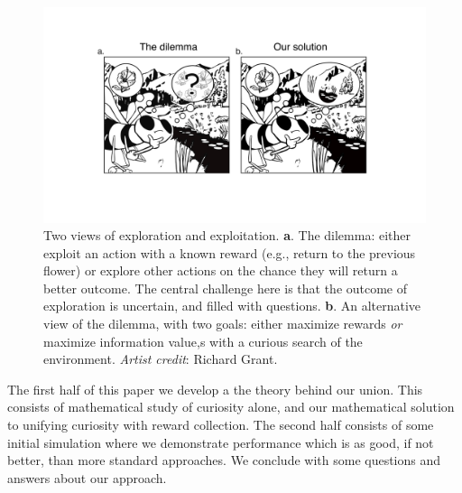 \begin{figure}
	\begin{fullwidth}
	\includegraphics[width=.9\linewidth]{img/bee.pdf} 
	\caption{Two views of exploration and exploitation. \textbf{a}. The dilemma: either exploit an action with a known reward (e.g., return to the previous flower) or explore other actions on the chance they will return a better outcome. The central challenge here is that the outcome of exploration is uncertain, and filled with questions. \textbf{b}. An alternative view of the dilemma, with two goals: either maximize rewards \textit{or} maximize information value,s with a curious search of the environment. \textit{Artist credit}: Richard Grant.}
	\label{fig:bee} 
	\end{fullwidth}
\end{figure}

The first half of this paper we develop a the theory behind our union. This consists of mathematical study of curiosity alone, and our mathematical solution to unifying curiosity with reward collection. The second half consists of some initial simulation where we demonstrate performance which is as good, if not better, than more standard approaches. We conclude with some questions and answers about our approach.
